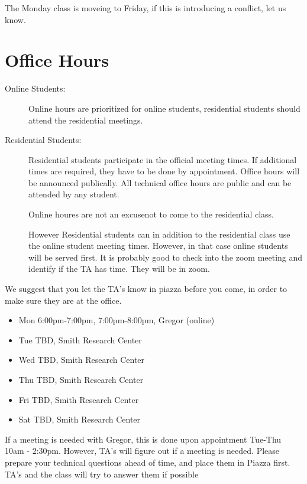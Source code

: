 The Monday class is moveing to Friday, if this is introducing a
conflict, let us know.

\section{Office Hours}\label{office-hours}

\begin{description}

\item[Online Students:] Online hours are prioritized for online students,
  residential students should attend the residential meetings. 

\item[Residential Students:] Residential students participate in the
  official meeting times. If additional times are required, they have
  to be done by appointment. Office hours will be announced
  publically. All technical office hours are public and can be
  attended by any student.

  Online houres are not an excusenot to come to the residential class.

  However Residential students can in addition to the residential
  class use the online student meeting times.  However, in that case
  online students will be served first. It is probably good to check
  into the zoom meeting and identify if the TA has time. They will be
  in zoom.

\end{description}

We suggest that you let the TA's know in piazza before you come, in order to make
sure they are at the office.


\begin{itemize}
\item Mon 6:00pm-7:00pm, 7:00pm-8:00pm, Gregor (online)
\item Tue TBD, Smith Research Center
\item Wed TBD, Smith Research Center
\item Thu TBD, Smith Research Center
\item Fri TBD, Smith Research Center
\item Sat TBD, Smith Research Center
\end{itemize}


If a meeting is needed with Gregor, this is done upon appointment
Tue-Thu 10am - 2:30pm. However, TA's will figure out if a meeting is needed.
Please prepare your technical questions ahead of time, and place them in Piazza
first. TA's and the class will try to answer them if possible

